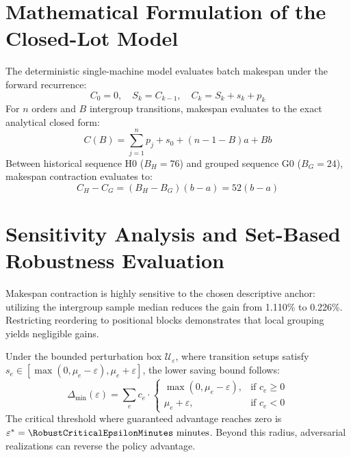 \section{Mathematical Formulation of the Closed-Lot Model}
\label{sec:mathematical_model}

The deterministic single-machine model evaluates batch makespan under the forward recurrence:
\begin{equation}
C_0 = 0, \quad S_k = C_{k-1}, \quad C_k = S_k + s_k + p_k
\end{equation}
For $n$ orders and $B$ intergroup transitions, makespan evaluates to the exact analytical closed form:
\begin{equation}
C(B) = \sum_{j=1}^{n} p_j + s_0 + (n - 1 - B)a + Bb
\end{equation}
Between historical sequence H0 ($B_H = 76$) and grouped sequence G0 ($B_G = 24$), makespan contraction evaluates to:
\begin{equation}
C_H - C_G = (B_H - B_G)(b - a) = 52(b - a)
\end{equation}




\section{Sensitivity Analysis and Set-Based Robustness Evaluation}
\label{sec:sensitivity_robustness}





Makespan contraction is highly sensitive to the chosen descriptive anchor: utilizing the intergroup sample median reduces the gain from 1.110\% to 0.226\%. Restricting reordering to positional blocks demonstrates that local grouping yields negligible gains.



Under the bounded perturbation box $\mathcal{U}_\varepsilon$, where transition setups satisfy $s_e \in [\max(0, \mu_e - \varepsilon), \mu_e + \varepsilon]$, the lower saving bound follows:
\begin{equation}
\Delta_{\min}(\varepsilon) = \sum_{e} c_e \cdot \begin{cases} \max(0, \mu_e - \varepsilon), & \text{if } c_e \ge 0 \\ \mu_e + \varepsilon, & \text{if } c_e < 0 \end{cases}
\end{equation}
The critical threshold where guaranteed advantage reaches zero is $\varepsilon^* = \RobustCriticalEpsilonMinutes\text{ minutes}$. Beyond this radius, adversarial realizations can reverse the policy advantage.

